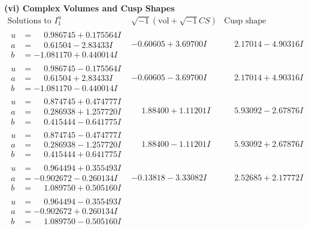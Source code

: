 \documentclass[1p]{elsarticle_modified}
\theoremstyle{definition}
\newcommand{\I}{\sqrt{-1}}
\begin{document}
\newpage\flushleft \textbf{(vi) Complex Volumes and Cusp Shapes}
$$\begin{array}{c|c|c}  
\text{Solutions to }I^u_{1}& \I (\text{vol} + \sqrt{-1}CS) & \text{Cusp shape}\\
 \hline 
\begin{aligned}
u &= \phantom{-}0.986745 + 0.175564 I \\
a &= \phantom{-}0.61504 - 2.83433 I \\
b &= -1.081170 + 0.440014 I\end{aligned}
 & -0.60605 + 3.69700 I & \phantom{-}2.17014 - 4.90316 I \\ \hline\begin{aligned}
u &= \phantom{-}0.986745 - 0.175564 I \\
a &= \phantom{-}0.61504 + 2.83433 I \\
b &= -1.081170 - 0.440014 I\end{aligned}
 & -0.60605 - 3.69700 I & \phantom{-}2.17014 + 4.90316 I \\ \hline\begin{aligned}
u &= \phantom{-}0.874745 + 0.474777 I \\
a &= \phantom{-}0.286938 + 1.257720 I \\
b &= \phantom{-}0.415444 - 0.641775 I\end{aligned}
 & \phantom{-}1.88400 + 1.11201 I & \phantom{-}5.93092 - 2.67876 I \\ \hline\begin{aligned}
u &= \phantom{-}0.874745 - 0.474777 I \\
a &= \phantom{-}0.286938 - 1.257720 I \\
b &= \phantom{-}0.415444 + 0.641775 I\end{aligned}
 & \phantom{-}1.88400 - 1.11201 I & \phantom{-}5.93092 + 2.67876 I \\ \hline\begin{aligned}
u &= \phantom{-}0.964494 + 0.355493 I \\
a &= -0.902672 - 0.260134 I \\
b &= \phantom{-}1.089750 + 0.505160 I\end{aligned}
 & -0.13818 - 3.33082 I & \phantom{-}2.52685 + 2.17772 I \\ \hline\begin{aligned}
u &= \phantom{-}0.964494 - 0.355493 I \\
a &= -0.902672 + 0.260134 I \\
b &= \phantom{-}1.089750 - 0.505160 I\end{aligned}

\end{array}$$
\end{document}
